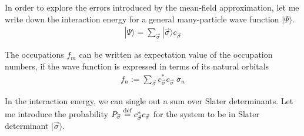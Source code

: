 \documentclass[11pt,a4paper]{report}
\begin{document}
In order to explore the errors introduced by the mean-field
approximation, let me write down the interaction energy for a general
many-particle wave function $|\Psi\rangle$. 
\begin{eqnarray}
|\Psi\rangle=\sum_{\vec{\sigma}}|\vec{\sigma}\rangle c_{\vec{\sigma}}
\label{eq:hfmpwf1}
\end{eqnarray}

The occupations $f_m$ can be written as expectation value of the
occupation numbers, if the wave function is expressed in terms of
its natural orbitals
\begin{eqnarray}
f_n:=\sum_{\vec{\sigma}} c^*_{\vec{\sigma}}c_{\vec{\sigma}}\; \sigma_n
\end{eqnarray}

In the interaction energy, we can single out a sum over Slater
determinants. Let me introduce the probability $P_{\vec{\sigma}}\stackrel{\text{def}}{=}
c^*_{\vec{\sigma}}c_{\vec{\sigma}}$ for the system to be in Slater
determinant $|\vec{\sigma}\rangle$. 
\end{document}
